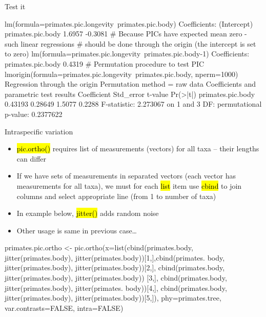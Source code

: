 \documentclass[compress, ucs, xelatex, 11pt, xcolor=svgnames,
  hyperref={
    bookmarks=true,
    unicode=true,
    colorlinks=true,
    pdftitle={Molecular data in R},
    plainpages=false,
    pdfauthor={Vojtech Zeisek},
    pdfsubject={Course about phylogeny and evolution in R},
    pdfcreator={XeLaTeX},
    pdfkeywords={R, evolution, phylogeny, molecular data},
    linkcolor=Tomato,
    anchorcolor=SaddleBrown,
    citecolor=Goldenrod,
    filecolor=DarkMagenta,
    menucolor=Sienna,
    urlcolor=DarkTurquoise,
    pdftex},
  url={hyphens, lowtilde} %
  ]{beamer}
\renewcommand{\texttt}[1]{\hl{\ttfamily #1}}
\begin{document}
\begin{frame}[fragile]{Test it}
  \begin{spluscode}
    lm(formula=primates.pic.longevity~primates.pic.body)
    Coefficients:
      (Intercept)  primates.pic.body
           1.6957            -0.3081
    # Because PICs have expected mean zero - such linear regressions
    # should be done through the origin (the intercept is set to zero)
    lm(formula=primates.pic.longevity~primates.pic.body-1)
    Coefficients:
    primates.pic.body
               0.4319
    # Permutation procedure to test PIC
    lmorigin(formula=primates.pic.longevity~primates.pic.body, nperm=1000)
    Regression through the origin
    Permutation method = raw data
    Coefficients and parametric test results
                       Coefficient Std_error t-value Pr(>|t|)
    primates.pic.body     0.43193   0.28649  1.5077   0.2288
    F-statistic: 2.273067 on 1 and 3 DF:
      permutational p-value: 0.2377622
  \end{spluscode}
\end{frame}

\begin{frame}[fragile]{Intraspecific variation}
  \begin{itemize}
    \item \texttt{pic.ortho()} requires list of measurements (vectors) for all taxa -- their lengths can differ
    \item If we have sets of measurements in separated vectors (each vector has measurements for all taxa), we must for each \texttt{list} item use \texttt{cbind} to join columns and select appropriate line (from 1 to number of taxa)
    \item In example below, \texttt{jitter()} adds random noise
    \item Other usage is same in previous case\ldots
  \end{itemize}
  \begin{spluscode}
    primates.pic.ortho <- pic.ortho(x=list(cbind(primates.body,
      jitter(primates.body), jitter(primates.body))[1,],cbind(primates.
      body, jitter(primates.body), jitter(primates.body))[2,],
      cbind(primates.body, jitter(primates.body), jitter(primates.body))
      [3,], cbind(primates.body, jitter(primates.body), jitter(primates.
      body))[4,], cbind(primates.body, jitter(primates.body), 
      jitter(primates.body))[5,]), phy=primates.tree, var.contrasts=FALSE,
      intra=FALSE)
  \end{spluscode}
\end{frame}
\end{document}
